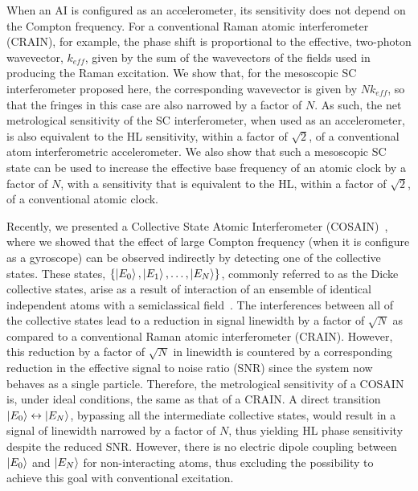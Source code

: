 \documentclass[aps,pra,letterpaper,superscriptaddress,showpacs,amsmath,floats,twocolumn]{revtex4-1}
\begin{document}
When an AI is configured as an accelerometer, its sensitivity does not depend on the Compton frequency.  For a conventional Raman atomic interferometer (CRAIN), for example, the phase shift is proportional to the effective, two-photon wavevector, $k_{eff}$, given by the sum of the wavevectors of the fields used in producing the Raman excitation.  We show that, for the mesoscopic SC interferometer proposed here, the corresponding wavevector is given by $Nk_{eff}$, so that the fringes in this case are also narrowed by a factor of $N$.  As such, the net metrological sensitivity of the SC interferometer, when used as an accelerometer, is also equivalent to the HL sensitivity, within a factor of $\sqrt{2}$, of a conventional atom interferometric accelerometer.  We also show that such a mesoscopic SC state can be used to increase the effective base frequency of an atomic clock by a factor of $N$, with a sensitivity that is equivalent to the HL, within a factor of $\sqrt{2}$, of a conventional atomic clock. 

Recently, we presented a Collective State Atomic Interferometer (COSAIN)~\cite{COSAIN}, where we showed that the effect of large Compton frequency (when it is configure as a gyroscope) can be observed indirectly by detecting one of the collective states. These states, $\{\ket{E_0}, \ket{E_1}, \ldots, \ket{E_N}\}$, commonly referred to as the Dicke collective states, arise as a result of interaction of an ensemble of identical independent atoms with a semiclassical field~\cite{CollectiveDescription, Dicke, Arecchi}. The interferences between all of the collective states lead to a reduction in signal linewidth by a factor of $\sqrt{N}$ as compared to a conventional Raman atomic interferometer (CRAIN). However, this reduction by a factor of $\sqrt{N}$ in linewidth is countered by a corresponding reduction in the effective signal to noise ratio (SNR) since the system now behaves as a single particle. Therefore, the metrological sensitivity of a COSAIN is, under ideal conditions, the same as that of a CRAIN. A direct transition $\ket{E_0}\leftrightarrow\ket{E_N}$, bypassing all the intermediate collective states, would result in a signal of linewidth narrowed by a factor of $N$, thus yielding HL phase sensitivity despite the reduced SNR. However, there is no electric dipole coupling between $\ket{E_0}$ and $\ket{E_N}$ for non-interacting atoms, thus excluding the possibility to achieve this goal with conventional excitation.
\end{document}
